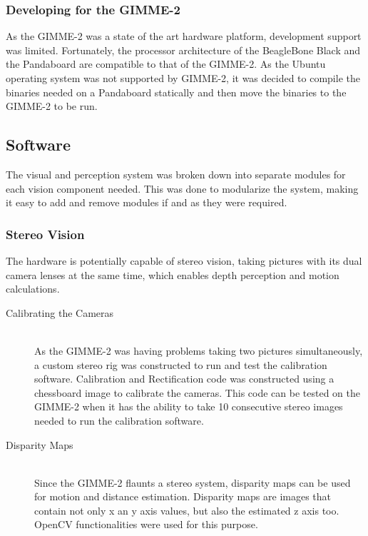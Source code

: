 \subsubsection{Developing for the GIMME-2}
As the GIMME-2 was a state of the art hardware platform, development support was limited. Fortunately, the processor architecture of the BeagleBone Black and the Pandaboard are compatible to that of the GIMME-2. As the Ubuntu operating system was not supported by GIMME-2, it was decided to compile the binaries needed on a Pandaboard statically and then move the binaries to the GIMME-2 to be run.

\subsection{Software}
The visual and perception system was broken down into separate modules for each vision component needed. This was done to modularize the system, making it easy to add and remove modules if and as they were required.  
\subsubsection{Stereo Vision}
The hardware is potentially capable of stereo vision, taking pictures with its dual camera lenses at the same time, which enables depth perception and motion calculations.

\begin{description}
  \item [Calibrating the Cameras] \hfill \\As the GIMME-2 was having problems taking two pictures simultaneously, a custom stereo rig was constructed to run and test the calibration software. Calibration and Rectification code was constructed using a chessboard image to calibrate the cameras. This code can be tested on the GIMME-2 when it has the ability to take 10 consecutive stereo images needed to run the calibration software.
  \item [Disparity Maps] \hfill \\Since the GIMME-2 flaunts a stereo system, disparity maps can be used for motion and distance estimation. Disparity maps are images that contain not only x an y axis values, but also the estimated z axis too. OpenCV functionalities were used for this purpose.

\end{description}

